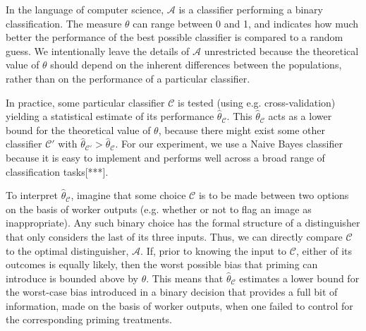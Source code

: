 \documentclass[letterpaper]{article}
\begin{document}
In the language of computer science, $\mathcal{A}$ is a classifier performing
a binary classification.  The measure $\theta$ can range between 0 and 1, and 
indicates how much better the performance of the best possible classifier is 
compared to a random guess. We intentionally leave the details of 
$\mathcal{A}$ unrestricted because the theoretical value of $\theta$ should 
depend on the inherent differences between the populations, rather than on 
the performance of a particular classifier.

In practice, some particular classifier $\mathcal{C}$ is tested (using e.g. 
cross-validation) yielding a statistical estimate of its performance 
$\hat{\theta}_\mathcal{C}$. This
$\hat{\theta}_\mathcal{C}$ acts as a lower bound for the 
theoretical value of $\theta$, because there might 
exist some other classifier $\mathcal{C}'$ with 
$\hat{\theta}_\mathcal{C'}>\hat{\theta}_\mathcal{C}$.
For our experiment, we use a Naive Bayes classifier because it is easy to
implement and performs well across a broad range of classification tasks[***].

To interpret $\hat{\theta}_\mathcal{C}$, imagine that some choice 
$\mathcal{C}$ is to be made between two options on the basis of worker 
outputs (e.g. whether or not to flag an image as inappropriate). Any such 
binary choice has the formal structure of a distinguisher that only considers 
the last of its three inputs. Thus, we can directly compare $\mathcal{C}$ to 
the optimal distinguisher, $\mathcal{A}$.  If, prior to knowing the input to 
$\mathcal{C}$, either of its outcomes is equally likely, then the worst 
possible bias that priming can introduce is bounded above by $\theta$. 
This means that $\hat{\theta}_\mathcal{C}$ estimates a 
lower bound for the worst-case bias introduced in a binary 
decision that provides a full bit of information, made on the basis of worker 
outputs, when one failed to control for the corresponding priming treatments.
\end{document}
